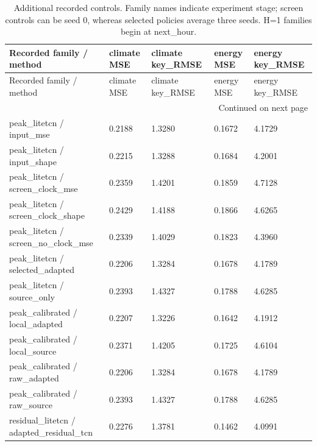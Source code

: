 {\footnotesize
\setlength{\tabcolsep}{3pt}
\renewcommand{\arraystretch}{1.17}
\begin{longtable}{@{}p{}p{}p{}p{}p{}@{}}
\caption{Additional recorded controls. Family names indicate experiment stage; screen controls can be seed 0, whereas selected policies average three seeds. H=1 families begin at next\_\allowbreak{}hour.}\label{tab:additional_controls}\\
\toprule
Recorded family / method & climate MSE & climate key\_\allowbreak{}RMSE & energy MSE & energy key\_\allowbreak{}RMSE \\
\midrule\endfirsthead
Recorded family / method & climate MSE & climate key\_\allowbreak{}RMSE & energy MSE & energy key\_\allowbreak{}RMSE \\
\midrule\endhead
\midrule\multicolumn{5}{r}{Continued on next page}\\\endfoot
\bottomrule\endlastfoot
peak\_\allowbreak{}litetcn / input\_\allowbreak{}mse & 0.2188 & 1.3280 & 0.1672 & 4.1729 \\
peak\_\allowbreak{}litetcn / input\_\allowbreak{}shape & 0.2215 & 1.3288 & 0.1684 & 4.2001 \\
peak\_\allowbreak{}litetcn / screen\_\allowbreak{}clock\_\allowbreak{}mse & 0.2359 & 1.4201 & 0.1859 & 4.7128 \\
peak\_\allowbreak{}litetcn / screen\_\allowbreak{}clock\_\allowbreak{}shape & 0.2429 & 1.4188 & 0.1866 & 4.6265 \\
peak\_\allowbreak{}litetcn / screen\_\allowbreak{}no\_\allowbreak{}clock\_\allowbreak{}mse & 0.2339 & 1.4029 & 0.1823 & 4.3960 \\
peak\_\allowbreak{}litetcn / selected\_\allowbreak{}adapted & 0.2206 & 1.3284 & 0.1678 & 4.1789 \\
peak\_\allowbreak{}litetcn / source\_\allowbreak{}only & 0.2393 & 1.4327 & 0.1788 & 4.6285 \\
peak\_\allowbreak{}calibrated / local\_\allowbreak{}adapted & 0.2207 & 1.3226 & 0.1642 & 4.1912 \\
peak\_\allowbreak{}calibrated / local\_\allowbreak{}source & 0.2371 & 1.4205 & 0.1725 & 4.6104 \\
peak\_\allowbreak{}calibrated / raw\_\allowbreak{}adapted & 0.2206 & 1.3284 & 0.1678 & 4.1789 \\
peak\_\allowbreak{}calibrated / raw\_\allowbreak{}source & 0.2393 & 1.4327 & 0.1788 & 4.6285 \\
residual\_\allowbreak{}litetcn / adapted\_\allowbreak{}residual\_\allowbreak{}tcn & 0.2276 & 1.3781 & 0.1462 & 4.0991 \\

\end{longtable}}
